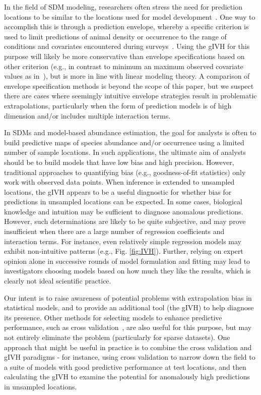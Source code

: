 \documentclass[10pt,letterpaper]{article}
\begin{document}
In the field of SDM modeling, researchers often stress the need for prediction locations to be similar to the locations used for model development~\cite{ElithLeathwick2009}.  One way to accomplish this is through a prediction envelope, whereby a specific criterion is used to limit predictions of animal density or occurrence to the range of conditions and covariates encountered during surveys~\cite{MannocciEtAl2015}.  Using the gIVH for this purpose will likely be more conservative than envelope specifications based on other criterion (e.g., in contrast to minimum an maximum observed covariate values as in~\cite{MannocciEtAl2015}), but is more in line with linear modeling theory.  A comparison of envelope specification methods is beyond the scope of this paper, but we suspect there are cases where seemingly intuitive envelope strategies result in problematic extrapolations, particularly when the form of prediction models is of high dimension and/or includes multiple interaction terms.

In SDMs and model-based abundance estimation, the goal for analysts is often to build predictive maps of species abundance and/or occurrence using a limited number of sample locations.
In such applications, the ultimate aim of analysts should be to build models that have low bias and high precision.  However, traditional approaches to quantifying bias (e.g., goodness-of-fit statistics) only work with observed data points.  When inference is extended to unsampled locations, the gIVH appears to be a useful diagnostic for whether bias for predictions in unsampled locations can be expected.  In some cases, biological knowledge and intuition may be sufficient to diagnose anomalous predictions.  However, such determinations are likely to be quite subjective, and may prove insufficient when there are a large number of regression coefficients and interaction terms.  For instance, even relatively simple regression models may exhibit non-intuitive patterns (e.g., Fig. \ref{fig:IVH}).  Further, relying on expert opinion alone in successive rounds of model formulation and fitting may lead to investigators choosing models based on how much they like the results, which is clearly not ideal scientific practice.

Our intent is to raise awareness of potential problems with extrapolation bias in statistical models, and to provide an additional tool (the gIVH) to help diagnose its presence.  Other methods for selecting models to enhance predictive performance, such as cross validation~\cite{PicardCook1984}, are also useful for this purpose, but may not entirely eliminate the problem (particularly for sparse datasets). One approach that might be useful in practice is to combine the cross validation and gIVH paradigms - for instance, using cross validation to narrow down the field to a suite of models with good predictive performance at test locations, and then calculating the gIVH to examine the potential for anomalously high predictions in unsampled locations.
\end{document}
